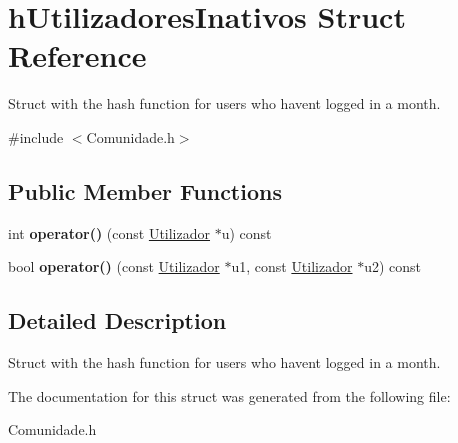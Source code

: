 \hypertarget{structh_utilizadores_inativos}{}\section{h\+Utilizadores\+Inativos Struct Reference}
\label{structh_utilizadores_inativos}


Struct with the hash function for users who haven\textquotesingle{}t logged in a month.  




{\ttfamily \#include $<$Comunidade.\+h$>$}

\subsection*{Public Member Functions}
\begin{DoxyCompactItemize}
\item 
\hypertarget{structh_utilizadores_inativos_a258ffb4f5cc1c5e27463258b84375a28}{}int {\bfseries operator()} (const \hyperlink{class_utilizador}{Utilizador} $\ast$u) const \label{structh_utilizadores_inativos_a258ffb4f5cc1c5e27463258b84375a28}

\item 
\hypertarget{structh_utilizadores_inativos_a3b56b082017184ccc5a4d56b00d62339}{}bool {\bfseries operator()} (const \hyperlink{class_utilizador}{Utilizador} $\ast$u1, const \hyperlink{class_utilizador}{Utilizador} $\ast$u2) const \label{structh_utilizadores_inativos_a3b56b082017184ccc5a4d56b00d62339}

\end{DoxyCompactItemize}


\subsection{Detailed Description}
Struct with the hash function for users who haven\textquotesingle{}t logged in a month. 

The documentation for this struct was generated from the following file\+:\begin{DoxyCompactItemize}
\item 
Comunidade.\+h\end{DoxyCompactItemize}
